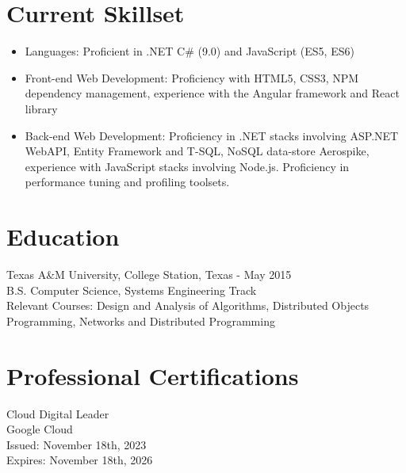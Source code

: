 \documentclass[11pt]{res} %
\begin{document}
\begin{resume}
\section{Current Skillset} 
 
   \begin{itemize} \itemsep -2pt  %
   \item Languages: Proficient in .NET C\# (9.0) and JavaScript (ES5, ES6)
\\
   \item Front-end Web Development: Proficiency with HTML5, CSS3, NPM dependency management, experience with the Angular framework and React library
\\
    \item Back-end Web Development: Proficiency in .NET stacks involving ASP.NET WebAPI, Entity Framework and T-SQL, NoSQL data-store Aerospike, experience with JavaScript stacks involving Node.js. Proficiency in performance tuning and profiling toolsets.
 \end{itemize}
 
\section{Education} 
 \noindent Texas A\&M University, College Station, Texas - May 2015 \\
B.S. Computer Science, Systems Engineering Track \\
Relevant Courses: Design and Analysis of Algorithms, Distributed Objects Programming, Networks and Distributed Programming
 
\section{Professional Certifications} 
 \noindent Cloud Digital Leader \\
Google Cloud \\
Issued: November 18th, 2023 \\
Expires: November 18th, 2026

\end{resume}
\end{document}
